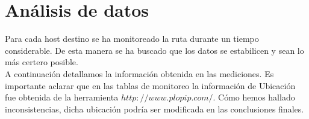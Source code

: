 \section{Análisis de datos}
Para cada host destino se ha monitoreado la ruta durante un tiempo considerable.
De esta manera se ha buscado que los datos se estabilicen y sean lo más certero posible.\\

A continuación detallamos la información obtenida en las mediciones. Es importante aclarar que en las tablas de monitoreo la información de Ubicación
fue obtenida de la herramienta $http://www.plopip.com/$. Cómo hemos hallado inconsistencias, dicha ubicación podría ser modificada en las conclusiones finales.







